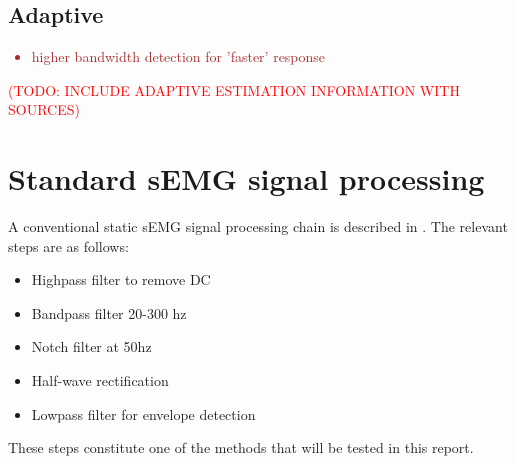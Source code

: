 \subsection{Adaptive}
\textcolor{brown}{\begin{itemize}
    \item higher bandwidth detection for 'faster' response
\end{itemize}}

\textcolor{red}{(TODO: INCLUDE ADAPTIVE ESTIMATION INFORMATION WITH SOURCES)}


\section{Standard sEMG signal processing}
A conventional static sEMG signal processing chain is described in \cite{muscle_force_estimation}. The relevant steps are as follows:
\begin{itemize}
    \item Highpass filter to remove DC
    \item Bandpass filter 20-300 hz
    \item Notch filter at 50hz
    \item Half-wave rectification
    \item Lowpass filter for envelope detection
\end{itemize}

These steps constitute one of the methods that will be tested in this report.